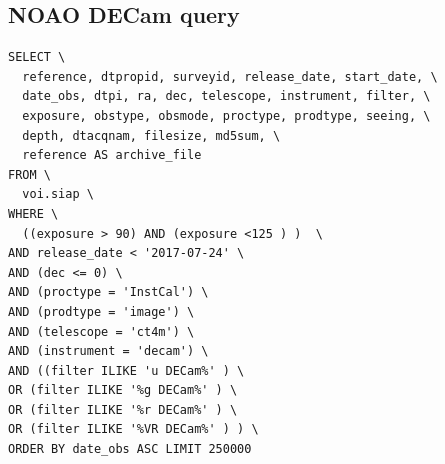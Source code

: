 \documentclass[DM,lsstdraft,toc,usenatbib]{lsstdoc}
\begin{document}
\subsection{NOAO DECam query}
\label{sec:sql_noao_decam}
\begin{lstlisting}
SELECT \
  reference, dtpropid, surveyid, release_date, start_date, \
  date_obs, dtpi, ra, dec, telescope, instrument, filter, \
  exposure, obstype, obsmode, proctype, prodtype, seeing, \
  depth, dtacqnam, filesize, md5sum, \
  reference AS archive_file
FROM \
  voi.siap \
WHERE \
  ((exposure > 90) AND (exposure <125 ) )  \
AND release_date < '2017-07-24' \
AND (dec <= 0) \
AND (proctype = 'InstCal') \
AND (prodtype = 'image') \
AND (telescope = 'ct4m') \
AND (instrument = 'decam') \
AND ((filter ILIKE 'u DECam%' ) \
OR (filter ILIKE '%g DECam%' ) \
OR (filter ILIKE '%r DECam%' ) \
OR (filter ILIKE '%VR DECam%' ) ) \
ORDER BY date_obs ASC LIMIT 250000
\end{lstlisting}




\end{document}
